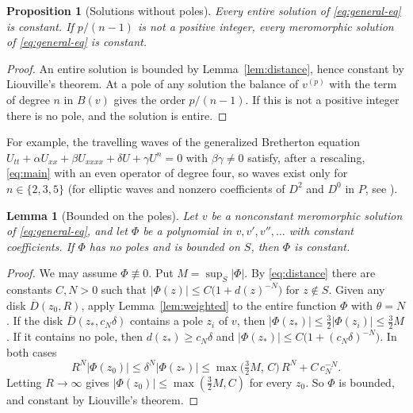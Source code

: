\documentclass[11pt]{article}
\newtheorem{proposition}[theorem]{Proposition}
\newtheorem{lemma}[theorem]{Lemma}
\theoremstyle{definition}
\theoremstyle{remark}
\numberwithin{equation}{section}
\begin{document}
\begin{proposition}[Solutions without poles]\label{prop:existence}
Every entire solution of \eqref{eq:general-eq} is constant. If
\(p/(n-1)\) is not a positive integer, every meromorphic solution of
\eqref{eq:general-eq} is constant.
\end{proposition}

\begin{proof}
An entire solution is bounded by Lemma~\ref{lem:distance}, hence
constant by Liouville's theorem. At a pole of any solution the balance
of \(v^{(p)}\) with the term of degree \(n\) in \(B(v)\) gives the
order \(p/(n-1)\). If this is not a positive integer there is no pole,
and the solution is entire.
\end{proof}

For example, the travelling waves of the generalized Bretherton
equation \(U_{tt}+\alpha U_{xx}+\beta U_{xxxx}+\delta U+\gamma U^n=0\)
with \(\beta\gamma\ne0\) satisfy, after a rescaling, \eqref{eq:main}
with an even operator of degree four, so waves exist only for
\(n\in\{2,3,5\}\) (for elliptic waves and nonzero coefficients of
\(D^2\) and \(D^0\) in \(P\), see
\citep{KudryashovSinelshchikovDemina2011}).

\begin{lemma}[Bounded on the poles]\label{lem:finite-values}
Let \(v\) be a nonconstant meromorphic solution of
\eqref{eq:general-eq}, and let \(\Phi\) be a polynomial in
\(v,v',v'',\dots\) with constant coefficients. If \(\Phi\) has no poles
and is bounded on \(S\), then \(\Phi\) is constant.
\end{lemma}

\begin{proof}
We may assume \(\Phi\not\equiv0\). Put \(M=\sup_S|\Phi|\). By
\eqref{eq:distance} there are constants \(C,N>0\) such that
\(|\Phi(z)|\le C\bigl(1+d(z)^{-N}\bigr)\) for \(z\notin S\). Given any
disk \(\overline D(z_0,R)\), apply Lemma~\ref{lem:weighted} to the
entire function \(\Phi\) with \(\theta=N\). If the disk
\(\overline D(z_*,c_N\delta)\) contains a pole \(z_i\) of \(v\), then
\(|\Phi(z_*)|\le\tfrac32|\Phi(z_i)|\le\tfrac32M\). If it contains no
pole, then \(d(z_*)\ge c_N\delta\) and
\(|\Phi(z_*)|\le C\bigl(1+(c_N\delta)^{-N}\bigr)\). In both cases
\[
 R^N|\Phi(z_0)|\le \delta^N|\Phi(z_*)|
 \le\max\bigl(\tfrac32M,\,C\bigr)\,R^N+C\,c_N^{-N}.
\]
Letting \(R\to\infty\) gives \(|\Phi(z_0)|\le\max(\tfrac32M,C)\) for
every \(z_0\). So \(\Phi\) is bounded, and constant by Liouville's
theorem.
\end{proof}
\end{document}
